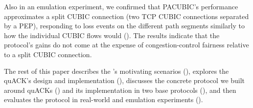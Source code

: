 Also in an emulation experiment, we confirmed that PACUBIC's
performance approximates a split CUBIC connection (two TCP CUBIC
connections separated by a PEP), responding to loss events on the
different path segments similarly to how the individual CUBIC flows would
(). The results indicate that the \sys protocol's gains
do not come at the
expense of congestion-control fairness relative to a split CUBIC connection.

\smallskip

The rest of this paper describes the \sys's motivating scenarios (), explores the quACK's design and implementation (), discusses
the concrete \sys protocol we built around quACKs () and
its implementation in two base protocols (), and then evaluates the protocol
in real-world and emulation experiments ().






